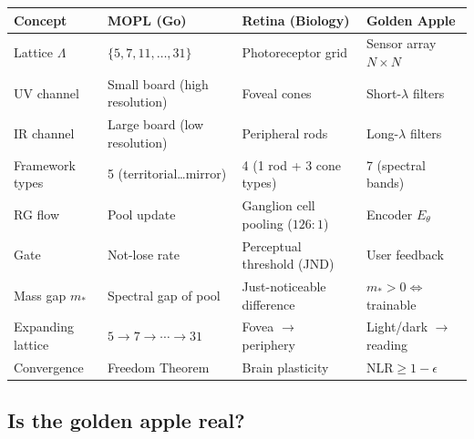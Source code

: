 \documentclass[11pt,a4paper]{article}
\begin{document}
\begin{center}
\small
\renewcommand{\arraystretch}{1.25}
\begin{tabular}{@{}llll@{}}
\toprule
\textbf{Concept} & \textbf{MOPL (Go)}
  & \textbf{Retina (Biology)}
  & \textbf{Golden Apple} \\
\midrule
Lattice $\Lambda$
  & $\{5,7,11,\ldots,31\}$
  & Photoreceptor grid
  & Sensor array $N \times N$ \\
UV channel
  & Small board (high resolution)
  & Foveal cones
  & Short-$\lambda$ filters \\
IR channel
  & Large board (low resolution)
  & Peripheral rods
  & Long-$\lambda$ filters \\
Framework types
  & 5 (territorial\ldots mirror)
  & 4 (1 rod + 3 cone types)
  & 7 (spectral bands) \\
RG flow
  & Pool update
  & Ganglion cell pooling ($126{:}1$)
  & Encoder $E_\theta$ \\
Gate
  & Not-lose rate
  & Perceptual threshold (JND)
  & User feedback \\
Mass gap $m_*$
  & Spectral gap of pool
  & Just-noticeable difference
  & $m_* > 0 \Leftrightarrow$ trainable \\
Expanding lattice
  & $5 \to 7 \to \cdots \to 31$
  & Fovea $\to$ periphery
  & Light/dark $\to$ reading \\
Convergence
  & Freedom Theorem
  & Brain plasticity
  & $\mathrm{NLR} \geq 1 - \epsilon$ \\
\bottomrule
\end{tabular}
\end{center}

\subsection{Is the golden apple real?}
\label{app:golden-apple-verdict}
\end{document}
